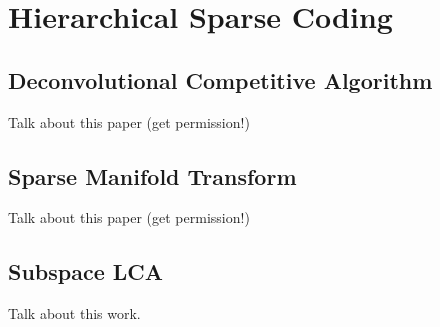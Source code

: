 \chapter{Hierarchical Sparse Coding}

\section{Deconvolutional Competitive Algorithm}
Talk about this paper (get permission!)

\section{Sparse Manifold Transform}
Talk about this paper (get permission!)

\section{Subspace LCA}
Talk about this work.